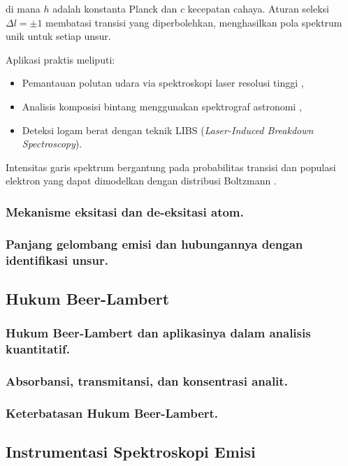 di mana $h$ adalah konstanta Planck dan $c$ kecepatan cahaya. Aturan seleksi $\Delta l = \pm 1$ \parencite{Liboff2003} membatasi transisi yang diperbolehkan, menghasilkan pola spektrum unik untuk setiap unsur.

Aplikasi praktis meliputi:
\begin{itemize}
\item Pemantauan polutan udara via spektroskopi laser resolusi tinggi \parencite{Demtroder2010},
\item Analisis komposisi bintang menggunakan spektrograf astronomi \parencite{Kaufmann2020},
\item Deteksi logam berat dengan teknik LIBS (\textit{Laser-Induced Breakdown Spectroscopy}).
\end{itemize}

Intensitas garis spektrum bergantung pada probabilitas transisi dan populasi elektron yang dapat dimodelkan dengan distribusi Boltzmann \parencite{Demtroder2010}.
\subsubsection{Mekanisme eksitasi dan de-eksitasi atom.}
\subsubsection{Panjang gelombang emisi dan hubungannya dengan identifikasi unsur.}


\subsection{Hukum Beer-Lambert}

\subsubsection{Hukum Beer-Lambert dan aplikasinya dalam analisis kuantitatif.}
\subsubsection{Absorbansi, transmitansi, dan konsentrasi analit.}
\subsubsection{Keterbatasan Hukum Beer-Lambert.}


\subsection{Instrumentasi Spektroskopi Emisi}


